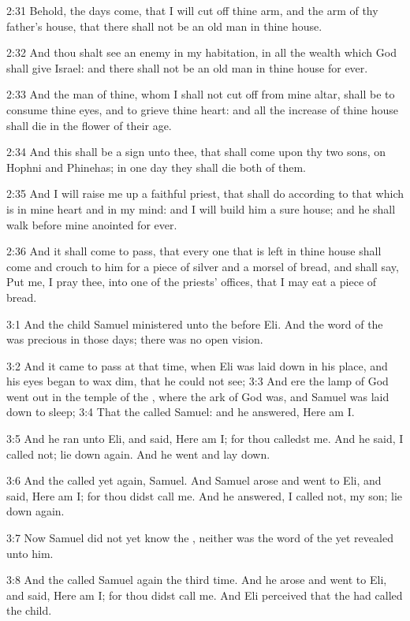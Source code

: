 2:31 Behold, the days come, that I will cut off thine arm, and the arm
of thy father's house, that there shall not be an old man in thine
house.

2:32 And thou shalt see an enemy in my habitation, in all the wealth
which God shall give Israel: and there shall not be an old man in
thine house for ever.

2:33 And the man of thine, whom I shall not cut off from mine altar,
shall be to consume thine eyes, and to grieve thine heart: and all the
increase of thine house shall die in the flower of their age.

2:34 And this shall be a sign unto thee, that shall come upon thy two
sons, on Hophni and Phinehas; in one day they shall die both of them.

2:35 And I will raise me up a faithful priest, that shall do according
to that which is in mine heart and in my mind: and I will build him a
sure house; and he shall walk before mine anointed for ever.

2:36 And it shall come to pass, that every one that is left in thine
house shall come and crouch to him for a piece of silver and a morsel
of bread, and shall say, Put me, I pray thee, into one of the priests'
offices, that I may eat a piece of bread.

3:1 And the child Samuel ministered unto the \LORD before Eli. And the
word of the \LORD was precious in those days; there was no open vision.

3:2 And it came to pass at that time, when Eli was laid down in his
place, and his eyes began to wax dim, that he could not see; 3:3 And
ere the lamp of God went out in the temple of the \LORD, where the ark
of God was, and Samuel was laid down to sleep; 3:4 That the \LORD
called Samuel: and he answered, Here am I.

3:5 And he ran unto Eli, and said, Here am I; for thou calledst me.
And he said, I called not; lie down again. And he went and lay down.

3:6 And the \LORD called yet again, Samuel. And Samuel arose and went
to Eli, and said, Here am I; for thou didst call me. And he answered,
I called not, my son; lie down again.

3:7 Now Samuel did not yet know the \LORD, neither was the word of the
\LORD yet revealed unto him.

3:8 And the \LORD called Samuel again the third time. And he arose and
went to Eli, and said, Here am I; for thou didst call me. And Eli
perceived that the \LORD had called the child.

